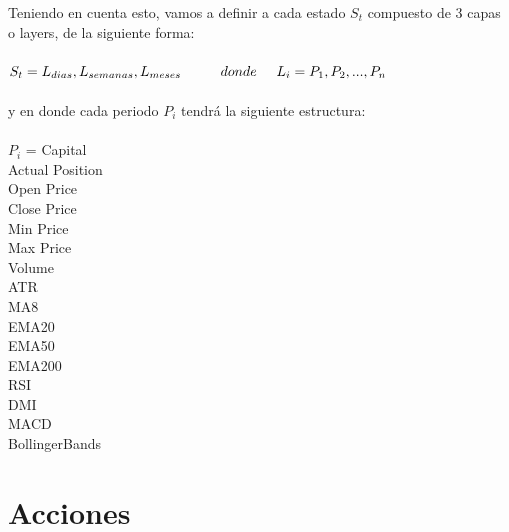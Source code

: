 \clearpage

Teniendo en cuenta esto, vamos a definir a cada estado $S_t$  compuesto de 3 capas o layers, de la siguiente forma:
\\\\

$ S_t = L_{dias}, L_{semanas}, L_{meses} \hspace*{1cm} donde \hspace*{0.5cm} L_i = P_1, P_2, ..., P_n $
\\\\
y en donde cada periodo $P_i$ tendrá la siguiente estructura:
\\\\
$P_i$ = Capital\\
\hspace*{0.8cm} Actual Position\\
\hspace*{0.8cm} Open Price\\
\hspace*{0.8cm} Close Price\\
\hspace*{0.8cm} Min Price\\
\hspace*{0.8cm} Max Price\\
\hspace*{0.8cm} Volume\\
\hspace*{0.8cm} ATR\\
\hspace*{0.8cm} MA8\\
\hspace*{0.8cm} EMA20\\
\hspace*{0.8cm} EMA50\\
\hspace*{0.8cm} EMA200\\
\hspace*{0.8cm} RSI\\
\hspace*{0.8cm} DMI\\
\hspace*{0.8cm} MACD\\
\hspace*{0.8cm} BollingerBands\\

\section{Acciones}

